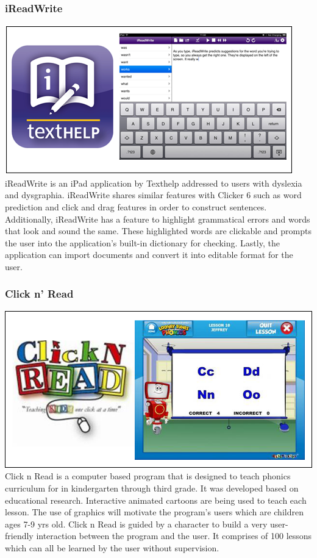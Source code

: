 \documentclass[letterpaper, 12pt, oneside]{book}
\begin{document}
\subsubsection{iReadWrite}
\includegraphics[width=\textwidth]{ireadwrite}
\newline
iReadWrite is an iPad application by Texthelp addressed to users with dyslexia and dysgraphia. iReadWrite shares similar features with Clicker 6 such as word prediction and click and drag features in order to construct sentences. Additionally, iReadWrite has a feature to highlight grammatical errors and words that look and sound the same. These highlighted words are clickable and prompts the user into the application’s built-in dictionary for checking. Lastly, the application can import documents and convert it into editable format for the user.

\subsubsection{Click n' Read}
\includegraphics[width=\textwidth]{clicknread}
\newline
Click n Read is a computer based program that is designed to teach phonics curriculum for  in kindergarten through third grade. It was developed based on educational research. Interactive animated cartoons are being used to teach each lesson. The use of graphics will motivate the program’s users which are children ages 7-9 yrs old. Click n Read is guided by a character to build a very user-friendly interaction between the program and the user. It comprises of 100 lessons which can all be learned by the user without supervision. 
\end{document}
